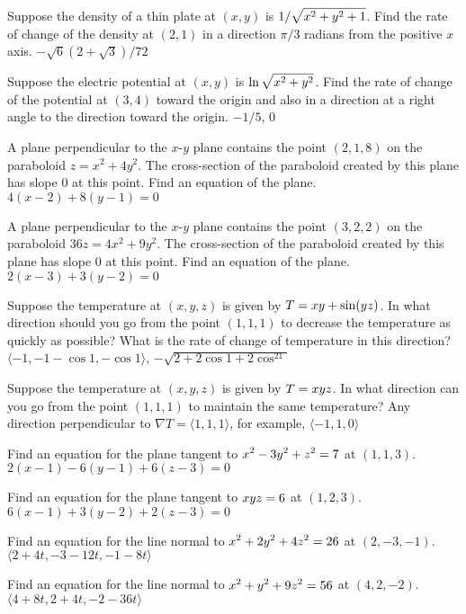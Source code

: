 \exercise Suppose the density of a thin plate at $(x,y)$ is
$\displaystyle 1/\sqrt{x^2+y^2+1}$. Find the rate of change of the density at
$(2,1)$ in a direction $\pi/3$ radians from the positive $x$ axis.
\answer $-\sqrt6(2+\sqrt3)/72$
\endanswer
\endexercise

\exercise Suppose the electric potential at $(x,y)$ is
$\displaystyle\ln\sqrt{x^2+y^2}$. Find the rate of change of the potential at
$(3,4)$ toward the origin and also in a direction at a right angle to
the direction toward the origin.
\answer $-1/5$, $0$
\endanswer
\endexercise

\exercise A plane perpendicular to the $x$-$y$ plane contains the
point $(2,1,8)$ on the paraboloid $z=x^2+4y^2$. The cross-section of
the paraboloid created by this plane has slope 0 at this point. Find
an equation of the plane.
\answer $4(x-2)+8(y-1)=0$
\endanswer
\endexercise

\exercise A plane perpendicular to the $x$-$y$ plane contains the
point $(3,2,2)$ on the paraboloid $36z=4x^2+9y^2$. The cross-section
of the paraboloid created by this plane has slope 0 at this point.
Find an equation of the plane.
\answer $2(x-3)+3(y-2)=0$
\endanswer
\endexercise

\exercise Suppose the temperature at $(x,y,z)$ is given by 
$\displaystyle T=xy+\sin(yz)$. In what direction should you go from the point 
$(1,1,1)$ to decrease the temperature as quickly as possible? What is
the rate of change of temperature in this direction?
\answer $\langle -1,-1-\cos1,-\cos1\rangle$, $-\sqrt{2+2\cos1+2\cos^21}$
\endanswer
\endexercise

\exercise Suppose the temperature at $(x,y,z)$ is given by 
$\displaystyle T=xyz$. In what direction can you go from the point 
$(1,1,1)$ to maintain the same temperature?
\answer Any direction perpendicular to $\nabla T=\langle
1,1,1\rangle$,
for example, $\langle -1,1,0\rangle$
\endanswer
\endexercise

\exercise Find an equation for the plane tangent to 
$\displaystyle x^2-3y^2+z^2=7$ at $(1,1,3)$.
\answer $2(x-1)-6(y-1)+6(z-3)=0$
\endanswer
\endexercise

\exercise Find an equation for the plane tangent to 
$\displaystyle xyz=6$ at $(1,2,3)$.
\answer $6(x-1)+3(y-2)+2(z-3)=0$
\endanswer
\endexercise

\exercise Find an equation for the line normal to 
$\displaystyle x^2+2y^2+4z^2=26 $ at $(2,-3,-1)$.
\answer $\langle 2+4t,-3-12t,-1-8t\rangle$
\endanswer
\endexercise

\exercise Find an equation for the line normal to 
$\displaystyle x^2+y^2+9z^2=56$ at $(4,2,-2)$.
\answer $\langle 4+8t,2+4t,-2-36t\rangle$
\endanswer
\endexercise

